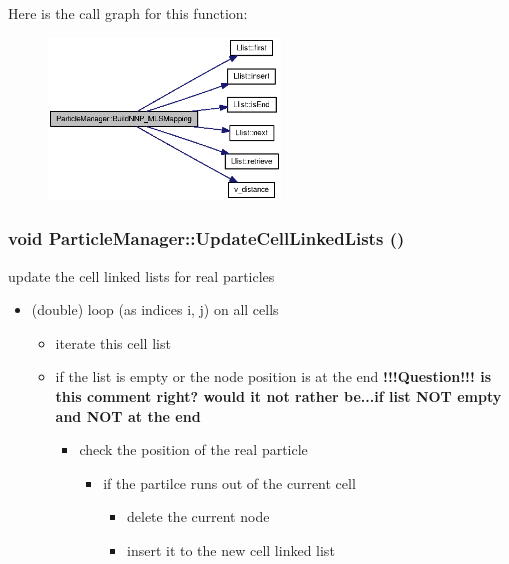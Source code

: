 Here is the call graph for this function:\nopagebreak
\begin{figure}[H]
\begin{center}
\leavevmode
\includegraphics[width=175pt]{classParticleManager_b68ab55a9429ac8d32368b531487dcec_cgraph}
\end{center}
\end{figure}
\hypertarget{classParticleManager_740244439672f753735abc5a6a7cc3bc}{
\subsubsection[{UpdateCellLinkedLists}]{\setlength{\rightskip}{0pt plus 5cm}void ParticleManager::UpdateCellLinkedLists ()}}
\label{classParticleManager_740244439672f753735abc5a6a7cc3bc}


update the cell linked lists for real particles 



\begin{itemize}
\item (double) loop (as indices i, j) on all cells

\begin{itemize}
\item iterate this cell list

\item if the list is empty or the node position is at the end {\bf !!!Question!!! is this comment right? would it not rather be...if list NOT empty and NOT at the end }

\begin{itemize}
\item check the position of the real particle

\begin{itemize}
\item if the partilce runs out of the current cell

\begin{itemize}
\item delete the current node

\item insert it to the new cell linked list\end{itemize}
\end{itemize}
\end{itemize}
\end{itemize}
\end{itemize}


